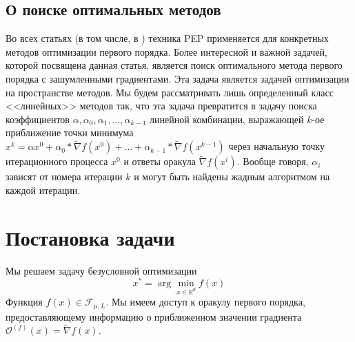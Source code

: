 \documentclass{article}
\newcommand{\R}{\mathbb{R}}
\begin{document}
\subsection{О поиске оптимальных методов}
Во всех статьях (в том числе, в \cite{kornilov2023intermediate}) техника PEP применяется для конкретных методов оптимизации первого порядка. Более интересной и важной задачей, которой посвящена данная статья, является поиск оптимального метода первого порядка с зашумленными градиентами. Эта задача является задачей оптимизации на пространстве методов. Мы будем рассматривать лишь определенный класс <<линейных>> методов так, что эта задача превратится в задачу поиска коэффициентов $\alpha, \alpha_0, \alpha_1, ... , \alpha_{k-1}$ линейной комбинации, выражающей $k$-ое приближение точки минимума $x^{k} = \alpha x^0 + \alpha_0 * \widetilde{\nabla} f(x^0) + ... + \alpha_{k-1} *\widetilde{\nabla} f(x^{k - 1})$ через начальную точку итерационного процесса $x^0$ и ответы оракула $\widetilde{\nabla} f(x^i)$. Вообще говоря, $\alpha_i$ зависят от номера итерации $k$ и могут быть найдены жадным алгоритмом на каждой итерации.

\section{Постановка задачи}
Мы решаем задачу безусловной оптимизации \[x^* = \arg \min_{x \in \R^d} f(x)\]
Функция $f(x) \in \mathcal{F}_{\mu, L}$. Мы имеем доступ к оракулу первого порядка, предоставляющему информацию о приближенном значении градиента $\mathcal{O}^{(f)} (x) = \widetilde{\nabla} f(x)$. 




\end{document}
